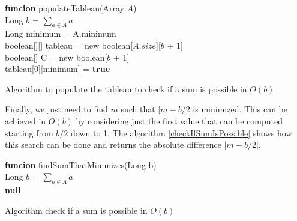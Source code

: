 \documentclass[tikz, 12pt]{scrartcl}
\begin{document}
\begin{algorithm}[th!]
	{\bf funcion} populateTableau(Array $A$)\\
	Long $b$ = $\sum_{a \in A}a$\\
	Long minimum = A.minimum\\
	boolean[][] tableau = new boolean[$A.size$][$b$ + 1]\\
	boolean[] C = new boolean[$b$ + 1]\\
	tableau[0][minimum] = \textbf{true}  
\caption{Algorithm to populate the tableau to check if a sum is possible in $O(b)$}
\label{isSumPossibleUpdate}
\end{algorithm}

Finally, we just need to find $m$ such that $|m - b / 2$ is minimized. This can be achieved in $O(b)$ by considering just the first value that can be computed starting from $b /2$ down to 1. The algorithm \ref{checkIfSumIsPossible} shows how this search can be done and returns the absolute difference $|m - b/2|$.

\begin{algorithm}[th!]
	{\bf funcion} findSumThatMinimizes(Long b)\\
	Long $b$ = $\sum_{a \in A}a$\\
	\Return \textbf{null}
\caption{Algorithm check if a sum is possible in $O(b)$}
\label{checkIfSumIsPossible}
\end{algorithm}
\end{document}
